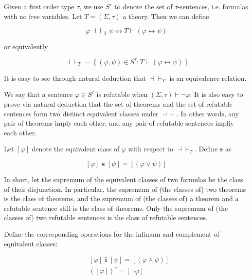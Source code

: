 \documentclass[a4paper, 12pt]{article}
\begin{document}
    
Given a first order type $\tau$, we use $S^\tau$ to denote the set of $\tau$-sentences,
i.e. formulas with no free variables. Let $T = (\Sigma, \tau)$ a theory. 
Then we can define 

\begin{equation*}
    \varphi \dashv \vdash_T \psi \iff T \vdash \left( \varphi \leftrightarrow \psi \right) 
\end{equation*}

or equivalently 

\begin{equation*}
    \dashv \vdash_T = \left\{ (\varphi, \psi) \in S^\tau : T \vdash \left( \varphi \leftrightarrow \psi \right)  \right\} 
\end{equation*}

It is easy to see through natural deduction that $\dashv \vdash_T$ is 
an equivalence relation.

We say that a sentence $\varphi \in S^\tau$ is refutable when $(\Sigma, \tau)
\vdash \neg \varphi$. It is also easy to prove via natural deduction that the
set of theorems and the set of refutable sentences form two distinct equivalent
classes under $\dashv \vdash $. In other words, any pair of theorems 
imply each other, and any pair of refutable sentences impliy each other.

Let $\left[ \varphi \right] $ denote the equivalent class of $\varphi$
with respect to $\dashv \vdash_T $. Define $\textbf{s}$ 
as

\begin{equation*}
    \left[ \varphi \right]  \textbf{ s } \left[ \psi \right] = \left[ \left( \varphi \lor  \psi \right)  \right] 
\end{equation*}

In short, let the supremum of the equivalent classes of two formulas be the
class of their disjunction. In particular, the supremum of (the classes of) two 
theorems is the class of theorems, and the supremum of (the classes of) a 
theorem and a refutable sentence still is the class of theorems. Only 
the supremum of (the classes of) two refutable sentences is the class of 
refutable sentences.

Define the corresponding operations for the infimum and complement of 
equivalent classes: 

\begin{align*}
    &\left[ \varphi \right] \textbf{ i } \left[ \psi \right] = \left[ \left( \varphi \land  \psi \right)  \right] \\ 
    &\left( \left[ \varphi \right]  \right)^c = \left[ \neg \varphi \right] 
\end{align*}
\end{document}
